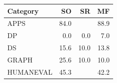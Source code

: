 \begin{tabular}{@{}lrrr@{}}
\toprule
Category & SO & SR & MF \\
\midrule
APPS & 84.0 & \todo{} & 88.9 \\
DP & 0.0 & 0.0 & 7.0 \\
DS & 15.6 & 10.0 & 13.8 \\
GRAPH & 25.6 & 10.0 & 10.0 \\
HUMANEVAL & 45.3 & \todo{} & 42.2 \\
\bottomrule
\end{tabular}
